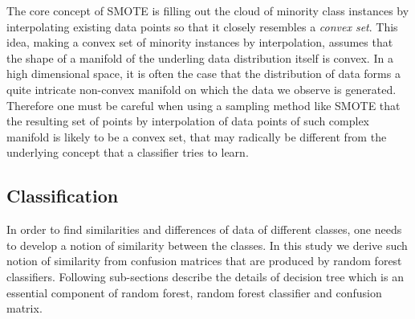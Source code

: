 The core concept of SMOTE is filling out the cloud of minority class instances by interpolating existing data points so that it closely resembles a \textit{convex set}. This idea, making a convex set of minority instances by interpolation, assumes that the shape of a manifold of the underling data distribution itself is convex. In a high dimensional space, it is often the case that the distribution of data forms a quite intricate non-convex manifold on which the data we observe is generated. Therefore one must be careful when using a sampling method like SMOTE that the resulting set of points by interpolation of data points of such complex manifold is likely to be a convex set, that may radically be different from the underlying concept that a classifier tries to learn.

	\subsection*{Classification}
	In order to find similarities and differences of data of different classes, one needs to develop a notion of similarity between the classes. In this study we derive such notion of similarity from confusion matrices that are produced by random forest classifiers. Following sub-sections describe the details of decision tree which is an essential component of random forest, random forest classifier and confusion matrix.
	
